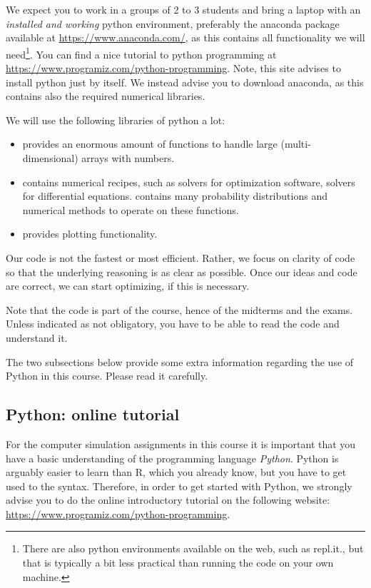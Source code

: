 We expect you to work in a groups of 2 to 3 students and bring a laptop with an \emph{installed and working} python environment, preferably  the anaconda package available at \url{https://www.anaconda.com/},  as this contains all functionality we will need\footnote{There are also python environments available on the web, such as repl.it., but that is typically a bit less practical than running the code on your own machine.}. You can find a nice tutorial to python programming at  \url{https://www.programiz.com/python-programming}. Note, this site advises to install python just by itself. We instead advise you to download anaconda, as this contains also the required numerical libraries. 

We will use the following libraries of python a lot:
\begin{itemize}
\item {}  provides an enormous amount of functions to handle large (multi-dimensional) arrays with numbers. 
\item {} contains numerical recipes, such as solvers for optimization software, solvers for differential equations.  contains many probability distributions and numerical methods to operate on these functions. 
\item {} provides plotting functionality.
\end{itemize}

Our code is not the fastest or most efficient.
Rather, we focus on clarity of code so that the underlying reasoning is as clear as possible.
Once our ideas and code are correct, we can start optimizing, if this is necessary.

Note that the code is part of the course, hence of the midterms and the exams.
Unless indicated as not obligatory, you have to be able to read the code and understand it.

The two subsections below provide some  extra information regarding the use of Python in this course. Please read it carefully.

\subsection*{Python: online tutorial}

For the computer simulation assignments in this course it is important that you have a basic understanding of the programming language \emph{Python}. Python is arguably easier to learn than R, which you already know, but you have to get used to the syntax. Therefore, in order to get started with Python, we strongly advise you to do the online introductory tutorial on the following website: \url{https://www.programiz.com/python-programming}.

